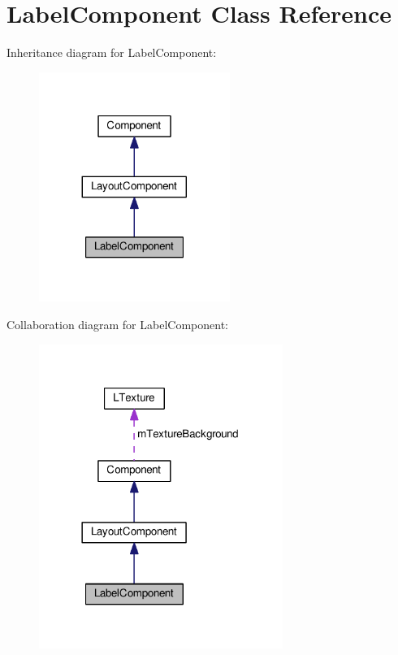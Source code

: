 \hypertarget{class_label_component}{}\section{Label\+Component Class Reference}
\label{class_label_component}


Inheritance diagram for Label\+Component\+:
\nopagebreak
\begin{figure}[H]
\begin{center}
\leavevmode
\includegraphics[width=176pt]{class_label_component__inherit__graph}
\end{center}
\end{figure}


Collaboration diagram for Label\+Component\+:
\nopagebreak
\begin{figure}[H]
\begin{center}
\leavevmode
\includegraphics[width=225pt]{class_label_component__coll__graph}
\end{center}
\end{figure}
